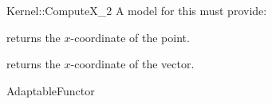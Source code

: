 \begin{ccRefFunctionObjectConcept}{Kernel::ComputeX_2}
A model for this must provide:


       {returns the $x$-coordinate of the point.}

       {returns the $x$-coordinate of the vector.}

\ccRefines
AdaptableFunctor



\end{ccRefFunctionObjectConcept}
